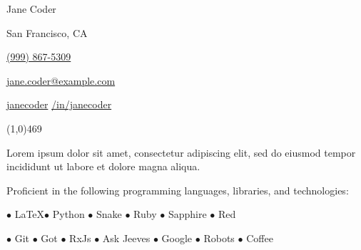 \documentclass[11pt]{article}
\begin{document}

\centerline{{\Huge \sc Jane Coder}}
\medskip
\centerline{\hspace{5pt}San Francisco, CA}
\smallskip
\centerline{\hspace{5pt}\href{tel:19998765309}{(999) 867-5309}}
\smallskip
\centerline{\hspace{5pt}\href{mailto:jane.coder@example.com}{ jane.coder@example.com}}
\smallskip
\centerline{\hspace{5pt}\href{https://github.com/<ADD YOUR GITHUB URL>}{ janecoder} \textbullet \hspace{5pt}\href{https://www.linkedin.com/in/<ADD YOUR LINKEDIN URL>/}{ /in/janecoder}}

\noindent\line(1,0){469}
\bigskip



\medskip

Lorem ipsum dolor sit amet, consectetur adipiscing elit, sed do eiusmod tempor incididunt ut labore et dolore magna aliqua.

\smallskip
Proficient in the following programming languages, libraries, and technologies:

\centerline{\hfill $\bullet$ \LaTeX \hfill $\bullet$ Python \hfill $\bullet$ Snake \hfill $\bullet$ Ruby \hfill $\bullet$ Sapphire \hfill $\bullet$ Red \hfill}
\smallskip
\centerline{\hfill $\bullet$ Git \hfill $\bullet$ Got \hfill $\bullet$ RxJs \hfill $\bullet$ Ask Jeeves \hfill $\bullet$ Google \hfill $\bullet$ Robots \hfill $\bullet$ Coffee \hfill}
\bigskip


%
\medskip
\end{document}
